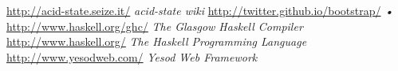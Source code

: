 \begin{thebibliography}{}
    \url{http://acid-state.seize.it/}
    \emph{acid-state wiki}
    \url{http://twitter.github.io/bootstrap/}
    \emph{•}
    \url{http://www.haskell.org/ghc/}
    \emph{The Glasgow Haskell Compiler}
    \url{http://www.haskell.org/}
    \emph{The Haskell Programming Language}
    \url{http://www.yesodweb.com/}
    \emph{Yesod Web Framework}
\end{thebibliography}
